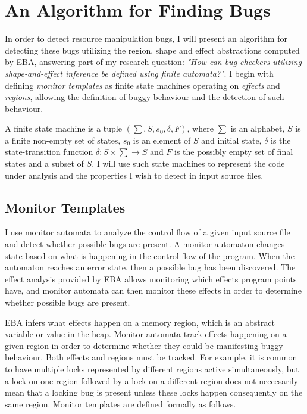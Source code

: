 \section{An Algorithm for Finding Bugs}
In order to detect resource manipulation bugs, I will present an algorithm for detecting these bugs utilizing the region, shape and effect abstractions computed by EBA, answering part of my research question: \textit{"How can bug checkers utilizing shape-and-effect inference be defined using finite automata?"}. I begin with defining \textit{monitor templates} as finite state machines operating on \textit{effects} and \textit{regions}, allowing the definition of buggy behaviour and the detection of such behaviour. 

\newpar A finite state machine is a tuple $(\sum, S, s_0, \delta, F)$, where $\sum$ is an alphabet, $S$ is a finite non-empty set of states, $s_0$ is an element of $S$ and initial state, $\delta$ is the state-transition function $\delta: S \times \sum \rightarrow S$ and $F$ is the possibly empty set of final states and a subset of $S$. I will use such state machines to represent the code under analysis and the properties I wish to detect in input source files. 

\subsection{Monitor Templates}
\label{monitor-template-section}
\noindent I use monitor automata to analyze the control flow of a given input source file and detect whether possible bugs are present. A monitor automaton changes state based on what is happening in the control flow of the program. When the automaton reaches an error state, then a possible bug has been discovered. The effect analysis provided by EBA allows monitoring which effects program points have, and monitor automata can then monitor these effects in order to determine whether possible bugs are present. 

\newpar EBA infers what effects happen on a memory region, which is an abstract variable or value in the heap. Monitor automata track effects happening on a given region in order to determine whether they could be manifesting buggy behaviour. Both effects and regions must be tracked. For example, it is common to have multiple locks represented by different regions active simultaneously, but a lock on one region followed by a lock on a different region does not neccesarily mean that a locking bug is present unless these locks happen consequently on the same region. Monitor templates are defined formally as follows. 


